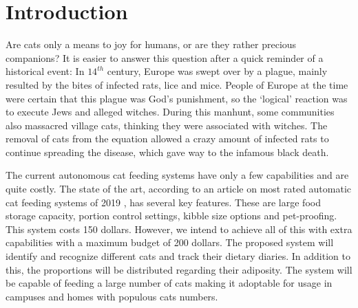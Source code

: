 
\section{Introduction} \label{sec:intro}


Are cats only a means to joy for humans, or are they rather precious companions? It is easier to answer this question after a quick reminder of a historical event: In \(14^{th}\) century, Europe was swept over by a plague, mainly resulted by the bites of infected rats, lice and mice. People of Europe at the time were certain that this plague was God's punishment, so the `logical' reaction was to execute Jews and alleged witches. During this manhunt, some communities also massacred village cats, thinking they were associated with witches. The removal of cats from the equation allowed a crazy amount of infected rats to continue spreading the disease, which gave way to the infamous black death.






The current autonomous cat feeding systems have only a few capabilities and are quite costly. The state of the art, according to an article on most rated automatic cat feeding systems of 2019 \cite{cite:SOTA}, has several key features. These are large food storage capacity, portion control settings, kibble size options and pet-proofing. This system costs 150 dollars. However, we intend to achieve all of this with extra capabilities with a maximum budget of 200 dollars. The proposed system will identify and recognize different cats and track their dietary diaries. In addition to this, the proportions will be distributed regarding their adiposity. The system will be capable of feeding a large number of cats making it adoptable for usage in campuses and homes with populous cats numbers. 

